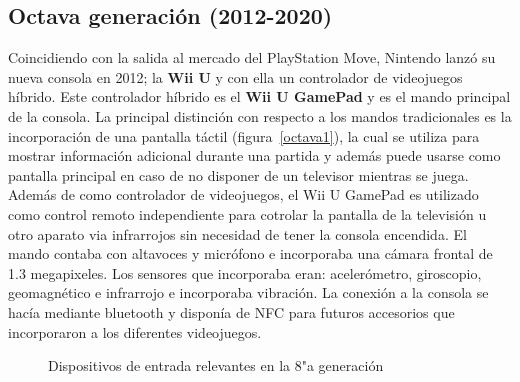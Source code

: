 
\subsection{Octava generaci\'on (2012-2020)}

Coincidiendo con la salida al mercado del PlayStation Move, Nintendo lanz\'o su nueva consola en 2012; la \textbf{Wii U} y con ella un controlador de videojuegos h\'ibrido. Este controlador h\'ibrido es el \textbf{Wii U GamePad} y es el mando principal de la consola. La principal distinci\'on con respecto a los mandos tradicionales es la incorporaci\'on de una pantalla t\'actil (figura~\ref{octava1}), la cual se utiliza para mostrar informaci\'on adicional durante una partida y adem\'as puede usarse como pantalla principal en caso de no disponer de un televisor mientras se juega. Adem\'as de como controlador de videojuegos, el Wii U GamePad es utilizado como control remoto independiente para cotrolar la pantalla de la televisi\'on u otro aparato via infrarrojos sin necesidad de tener la consola encendida. El mando contaba con altavoces y micr\'ofono e incorporaba una c\'amara frontal de 1.3 megapixeles. Los sensores que incorporaba eran: aceler\'ometro, giroscopio, geomagn\'etico e infrarrojo e incorporaba vibraci\'on. La conexi\'on a la consola se hac\'ia mediante bluetooth  y dispon\'ia de NFC para futuros accesorios que incorporaron a los diferentes videojuegos.\\

\begin{figure}[t]
     \hfill
{}
\hfill
{}
     \caption{Dispositivos de entrada relevantes en la 8"a  generaci\'on}
     \label{fig:octava}
   \end{figure}

